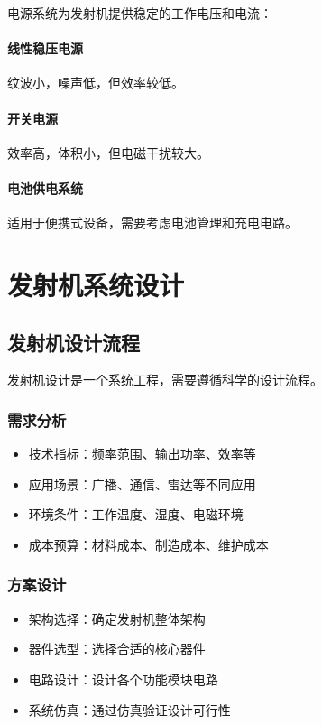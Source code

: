 \documentclass[12pt,UTF8]{ctexbook}
\begin{document}
电源系统为发射机提供稳定的工作电压和电流：

\subsubsection{线性稳压电源}
纹波小，噪声低，但效率较低。

\subsubsection{开关电源}
效率高，体积小，但电磁干扰较大。

\subsubsection{电池供电系统}
适用于便携式设备，需要考虑电池管理和充电电路。

\chapter{发射机系统设计}

\section{发射机设计流程}

发射机设计是一个系统工程，需要遵循科学的设计流程。

\subsection{需求分析}
\begin{itemize}[leftmargin=3.5em]
    \item 技术指标：频率范围、输出功率、效率等
    \item 应用场景：广播、通信、雷达等不同应用
    \item 环境条件：工作温度、湿度、电磁环境
    \item 成本预算：材料成本、制造成本、维护成本
\end{itemize}

\subsection{方案设计}
\begin{itemize}[leftmargin=3.5em]
    \item 架构选择：确定发射机整体架构
    \item 器件选型：选择合适的核心器件
    \item 电路设计：设计各个功能模块电路
    \item 系统仿真：通过仿真验证设计可行性
\end{itemize}
\end{document}
